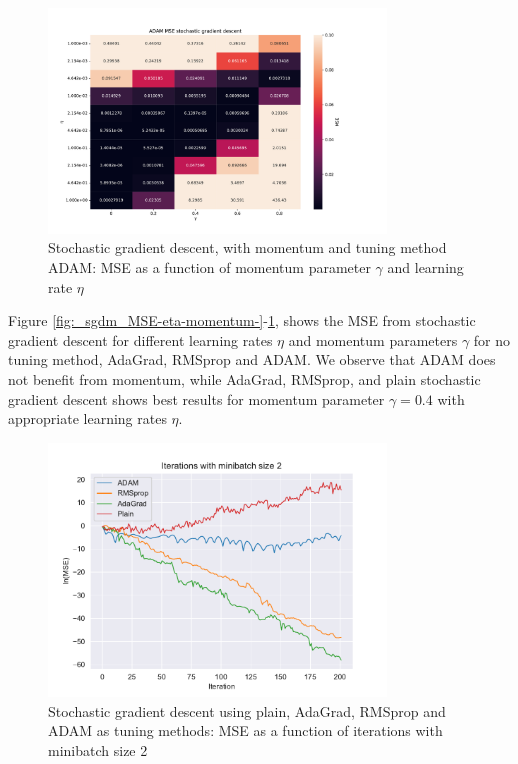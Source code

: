 \begin{figure}[H]
\centering
\includegraphics[width=0.8\textwidth]{Figures/PartA/ADAM_sgdm_MSE(eta,momentum)}
\caption{Stochastic gradient descent, with momentum and tuning method ADAM: MSE
    as a function of momentum parameter $\gamma$ and learning rate \(\eta \)	 }
\label{fig:ADAM_sgdm_MSE-eta-momentum-}
\end{figure}

Figure \ref{fig:_sgdm_MSE-eta-momentum-}-\ref{fig:ADAM_sgdm_MSE-eta-momentum-}, shows the MSE from stochastic gradient descent for different
learning rates $\eta $ and momentum parameters $\gamma $ for no tuning method, AdaGrad, RMSprop and ADAM. We observe that ADAM does not benefit 
from momentum, while AdaGrad, RMSprop, and plain stochastic gradient descent shows best results for momentum parameter $\gamma =0.4$ with appropriate 
learning rates $\eta $.  


\begin{figure}[H]
\centering
\includegraphics[width=0.8\textwidth]{Figures/PartA/minibatch_2_MSE(iter).pdf}
\caption{Stochastic gradient descent using plain, AdaGrad, RMSprop and ADAM as tuning methods: MSE as a function of iterations with minibatch size 2}
\label{fig:minibatch_2_MSE-iter-pdf}
\end{figure}

